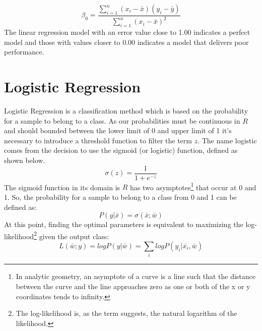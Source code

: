 \documentclass[12pt]{article}
\begin{document}
$$
\beta_{0} = \frac{\sum_{i=1}^{n} ( x_{i}-\bar{x}) (y_{i}-\bar{y})}{\sum_{i=1}^{n} ( x_{i}-\bar{x})^{2} }
$$
The linear regression model with an error value close to 1.00 indicates a perfect model and those with values closer to 0.00 indicates a model that delivers poor performance.

\newpage
\section{Logistic Regression}
Logistic Regression is a classification method which is based on the probability for a sample to belong to a class. As our probabilities must be continuous in $R$ and should bounded between the lower limit of 0 and upper limit of 1 it's necessary to introduce a threshold function to filter the term $z$. The name logistic comes from the decision to use the sigmoid (or logistic) function, defined as shown below.
$$\sigma(z)= \dfrac{1}{1+e^{-z}}$$
The sigmoid function in its domain is $R$ has two asymptotes\footnote{In analytic geometry, an asymptote of a curve is a line such that the distance between the curve and the line approaches zero as one or both of the x or y coordinates tends to infinity.} that occur at 0 and 1. So, the probability for a sample to belong to a class from 0 and 1 can be defined as:
$$P(y|\bar{x})=\sigma(\bar{x};\bar{w})$$
At this point, finding the optimal parameters is equivalent to maximizing the log-likelihood\footnote{The log-likelihood is, as the term suggests, the natural logarithm of the likelihood.}
given the output class:
$$L(\bar{w};y) = log P(y|\bar{w}) = \sum_{i} log P(y_{i}|\bar{x_{i}}, \bar{w})$$


\newpage
\end{document}
